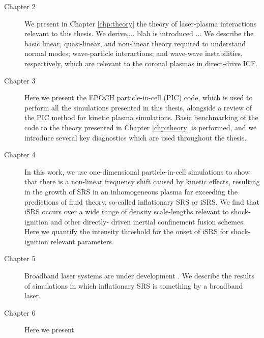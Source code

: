 \begin{description}
	\item[Chapter 2] We present in Chapter \ref{chp:theory} the theory of laser-plasma interactions relevant to this thesis. We derive,... blah is introduced ... We describe the basic linear, quasi-linear, and non-linear theory required to understand normal modes; wave-particle interactions; and wave-wave instabilities, respectively, which are relevant to the coronal plasmas in direct-drive ICF.
	
	\item[Chapter 3] Here we present the EPOCH particle-in-cell (\acrshort{PIC}) code, which is used to perform all the simulations presented in this thesis, alongside a review of the PIC method for kinetic plasma simulations. Basic benchmarking of the code to the theory presented in Chapter \ref{chp:theory} is performed, and we introduce several key diagnostics which are used throughout the thesis.
	 
	\item[Chapter 4] In this work, we use one-dimensional particle-in-cell 		
		simulations to show that there is a non-linear frequency shift caused  
		by kinetic effects, resulting in the growth of SRS in an inhomogeneous 
		plasma far exceeding the predictions of fluid theory, so-called 
		inflationary SRS or iSRS. We find that iSRS occurs over a wide range of 
		density scale-lengths relevant to shock-ignition and other directly-
		driven inertial confinement fusion schemes. Here we quantify the 
		intensity threshold for the onset of iSRS for shock-ignition relevant 
		parameters.
	\item[Chapter 5] Broadband laser systems are under development . We 	
		describe the results of simulations in which inflationary SRS is 	
		something by a broadband laser.
	\item[Chapter 6] Here we present 
\end{description}


%
%
